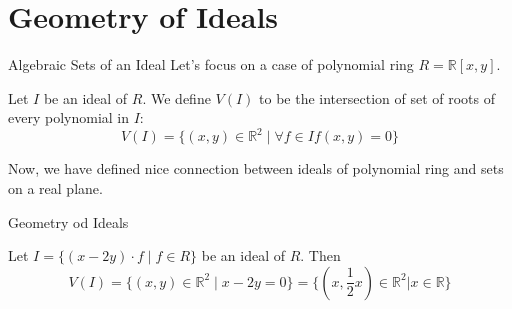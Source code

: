 \documentclass{beamer}
\begin{document}
\section{Geometry of Ideals}
\begin{frame}{Algebraic Sets of an Ideal}
    Let's focus on a case of polynomial ring $R = \mathbb{R}[x,y]$. 
    \begin{definition}
        Let $I$ be an ideal of $R$. We define $V(I)$ to be the intersection of set of roots of every polynomial in $I$:
        $$V(I) = \{ (x,y) \in \mathbb{R}^2 \mid \forall f \in I f(x,y) = 0\}$$
    \end{definition}
    \pause 
    Now, we have defined nice connection between ideals of polynomial ring and sets on a real plane.
\end{frame}
\begin{frame}{Geometry od Ideals }
    \begin{example}
    Let $I = \{ (x-2y)\cdot f \mid f \in R\}$ be an ideal of $R$. Then 
    $$V(I) = \{ (x,y) \in \mathbb{R}^2 \mid x-2y = 0\} = \{(x,\frac{1}{2}x) \in \mathbb{R}^2 | x \in \mathbb{R} \}$$
    \centering
    \end{example}
\end{frame}
\begin{frame}

\end{frame}
\end{document}
